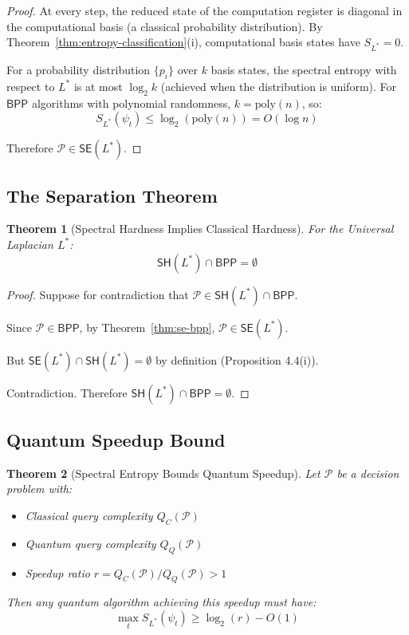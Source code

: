 \documentclass[11pt,a4paper]{article}
\theoremstyle{plain}
\newtheorem{theorem}{Theorem}[section]
\theoremstyle{definition}
\theoremstyle{remark}
\newcommand{\BPP}{\mathsf{BPP}}
\newcommand{\SE}{\mathsf{SE}}
\newcommand{\SH}{\mathsf{SH}}
\begin{document}
\begin{proof}
At every step, the reduced state of the computation register is diagonal in the computational basis (a classical probability distribution). By Theorem~\ref{thm:entropy-classification}(i), computational basis states have $S_{L^*} = 0$.

For a probability distribution $\{p_i\}$ over $k$ basis states, the spectral entropy with respect to $L^*$ is at most $\log_2 k$ (achieved when the distribution is uniform). For $\BPP$ algorithms with polynomial randomness, $k = \text{poly}(n)$, so:
\begin{equation}
    S_{L^*}(\psi_t) \leq \log_2(\text{poly}(n)) = O(\log n)
\end{equation}

Therefore $\mathcal{P} \in \SE(L^*)$.
\end{proof}

\subsection{The Separation Theorem}

\begin{theorem}[Spectral Hardness Implies Classical Hardness]\label{thm:separation}
For the Universal Laplacian $L^*$:
\begin{equation}
    \boxed{\SH(L^*) \cap \BPP = \emptyset}
\end{equation}
\end{theorem}

\begin{proof}
Suppose for contradiction that $\mathcal{P} \in \SH(L^*) \cap \BPP$.

Since $\mathcal{P} \in \BPP$, by Theorem~\ref{thm:se-bpp}, $\mathcal{P} \in \SE(L^*)$.

But $\SE(L^*) \cap \SH(L^*) = \emptyset$ by definition (Proposition 4.4(i)).

Contradiction. Therefore $\SH(L^*) \cap \BPP = \emptyset$.
\end{proof}

\subsection{Quantum Speedup Bound}

\begin{theorem}[Spectral Entropy Bounds Quantum Speedup]\label{thm:speedup}
Let $\mathcal{P}$ be a decision problem with:
\begin{itemize}[noitemsep]
    \item Classical query complexity $Q_C(\mathcal{P})$
    \item Quantum query complexity $Q_Q(\mathcal{P})$
    \item Speedup ratio $r = Q_C(\mathcal{P})/Q_Q(\mathcal{P}) > 1$
\end{itemize}
Then any quantum algorithm achieving this speedup must have:
\begin{equation}
    \boxed{\max_t S_{L^*}(\psi_t) \geq \log_2(r) - O(1)}
\end{equation}
\end{theorem}
\end{document}
